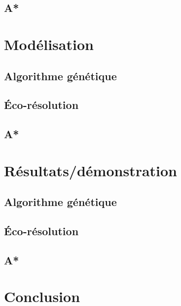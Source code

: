 \documentclass{beamer}
\begin{document}
        \subsection{A*}
            
    \section{Modélisation}
        \subsection{Algorithme génétique}
            
        \subsection{Éco-résolution}
            
        \subsection{A*}
            
    \section{Résultats/démonstration}
        \subsection{Algorithme génétique}
            
        \subsection{Éco-résolution}
            
        \subsection{A*}
            
    \section{Conclusion}
        \subsection{}
            
\end{document}
